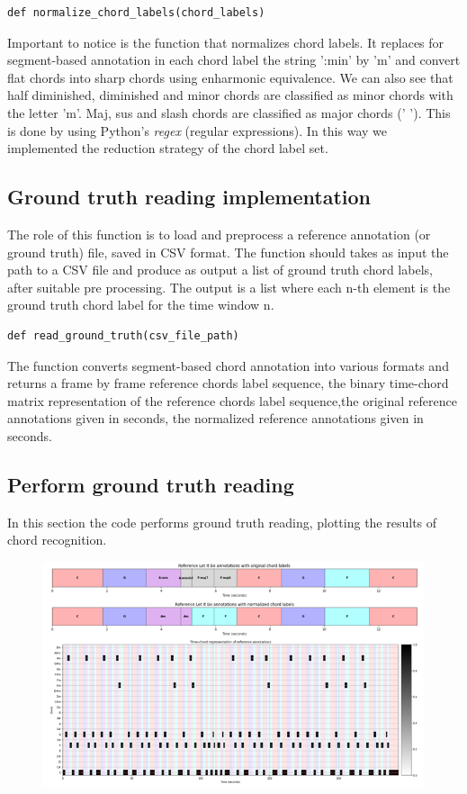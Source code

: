 \documentclass[
	12pt, %
]{fphw}
\begin{document}
\begin{lstlisting}
def normalize_chord_labels(chord_labels)
\end{lstlisting}

Important to notice is the function that normalizes chord labels.
It replaces for segment-based annotation in each chord label the string ':min' by 'm' and convert flat chords into sharp chords using enharmonic equivalence. We can also see that half diminished, diminished and minor chords are classified as minor chords with the letter 'm'. Maj, sus and slash  chords are classified as major chords (' '). This is done by using Python's \textit{regex} (regular expressions). In this way we implemented the reduction strategy of the chord label set.


\subsection{Ground truth reading implementation}
The role of this function is to load and preprocess a reference annotation (or ground truth) file, saved in CSV format. The function should takes as input the path to a CSV file and produce as output a list of ground truth chord labels, after suitable pre processing. The output is a list where each n-th element is the ground truth chord label for the time window n.

\begin{lstlisting}
def read_ground_truth(csv_file_path)
\end{lstlisting}

The function converts segment-based chord annotation into various formats and returns a frame by frame reference chords label sequence, the binary time-chord matrix representation of the reference chords label sequence,the original reference annotations given in seconds, the normalized reference annotations given in seconds.


\subsection{Perform ground truth reading}
In this section the code performs ground truth reading, plotting the results of chord recognition.

\begin{figure}[H]
 \centering
 \includegraphics[scale=1]{./images/2_reference_annotations.png}
\end{figure}
\end{document}
